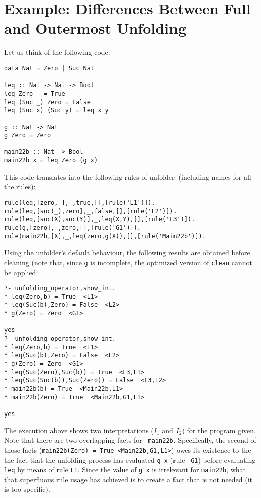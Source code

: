 \documentclass[11pt,a4paper,twoside,openright]{book}
\newcommand{\unfolder}{{\textsf{unfolder~}}}
\begin{document}
\section{Example: Differences Between Full and Outermost Unfolding}

Let us think of the following code:

\begin{verbatim}
data Nat = Zero | Suc Nat

leq :: Nat -> Nat -> Bool
leq Zero _ = True
leq (Suc _) Zero = False
leq (Suc x) (Suc y) = leq x y

g :: Nat -> Nat
g Zero = Zero

main22b :: Nat -> Bool
main22b x = leq Zero (g x)
\end{verbatim}

\noindent
This code translates into the following rules of \unfolder (including
names for all the rules):

\begin{verbatim}
rule(leq,[zero,_],_,true,[],[rule('L1')]).
rule(leq,[suc(_),zero],_,false,[],[rule('L2')]).
rule(leq,[suc(X),suc(Y)],_,leq(X,Y),[],[rule('L3')]).
rule(g,[zero],_,zero,[],[rule('G1')]).
rule(main22b,[X],_,leq(zero,g(X)),[],[rule('Main22b')]).
\end{verbatim}

\noindent
Using the unfolder's default behaviour, the following results are
obtained before cleaning (note that, since {\tt g} is incomplete, the
optimized version of {\tt clean} cannot be applied:

\begin{verbatim}
?- unfolding_operator,show_int.
* leq(Zero,b) = True  <L1>
* leq(Suc(b),Zero) = False  <L2>
* g(Zero) = Zero  <G1>

yes
?- unfolding_operator,show_int.
* leq(Zero,b) = True  <L1>
* leq(Suc(b),Zero) = False  <L2>
* g(Zero) = Zero  <G1>
* leq(Suc(Zero),Suc(b)) = True  <L3,L1>
* leq(Suc(Suc(b)),Suc(Zero)) = False  <L3,L2>
* main22b(b) = True  <Main22b,L1>
* main22b(Zero) = True  <Main22b,G1,L1>

yes
\end{verbatim}

\noindent
The execution above shows two interpretations ($I_1$ and $I_2$) for
the program given. Note that there are two overlapping facts for {\tt
  main22b}. Specifically, the second of those facts ({\tt *
  main22b(Zero) = True  <Main22b,G1,L1>}) owes its existence to the
the fact that the unfolding process has evaluated {\tt g x} (rule {\tt
  G1}) before evaluating {\tt leq} by means of rule {\tt L1}. Since
the value of {\tt g x} is irrelevant for {\tt main22b}, what that
superfluous rule usage has achieved is to create a fact that is not
needed (it is too specific).
\end{document}
